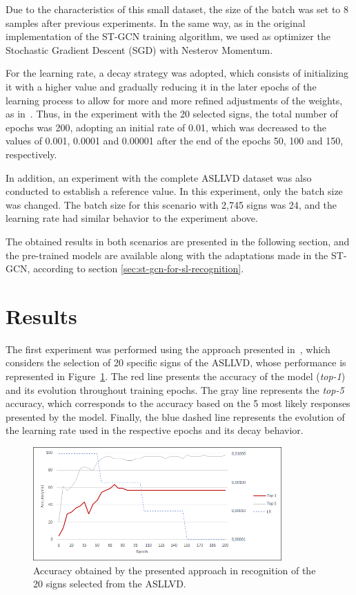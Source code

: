 Due to the characteristics of this small dataset, the size of the batch was set to 8 samples after previous experiments. 
In the same way, as in the original implementation of the ST-GCN training algorithm, we used as optimizer the Stochastic Gradient Descent (SGD) with Nesterov Momentum. 

For the learning rate, a decay strategy was adopted, which consists of initializing it with a higher value and gradually reducing it in the later epochs of the learning process to allow for more and more refined adjustments of the weights, as in~\cite{st-gcn-2018}. Thus, in the experiment with the 20 selected signs, the total number of epochs was 200, adopting an initial rate of 0.01, which was decreased to the values of 0.001, 0.0001 and 0.00001 after the end of the epochs 50, 100 and 150, respectively.

In addition, an experiment with the complete ASLLVD dataset was also conducted to establish a reference value. In this experiment, only the batch size was changed. The batch size for this scenario with 2,745 signs was 24, and the learning rate had similar behavior to the experiment above.

The obtained results in both scenarios are presented in the following section, and the pre-trained models are available along with the adaptations made in the ST-GCN, according to section \ref{sec:st-gcn-for-sl-recognition}.


\section{Results} 
\label{sec:results}

The first experiment was performed using the approach presented in~\cite{lim-2016}, which considers the selection of 20 specific signs of the ASLLVD, whose performance is represented in Figure~\ref{fig:training-asllvd-20}. The red line presents the accuracy of the model (\textit{top-1}) and its evolution throughout training epochs. The gray line represents the \textit{top-5} accuracy, which corresponds to the accuracy based on the 5 most likely responses presented by the model. Finally, the blue dashed line represents the evolution of the learning rate used in the respective epochs and its decay behavior.

\begin{figure}[!t]
    \centering
    \includegraphics[width=0.85\textwidth]{images/results_20}
    \caption{Accuracy obtained by the presented approach in recognition of the 20 signs selected from the ASLLVD.}
    \label{fig:training-asllvd-20}
\end{figure}

